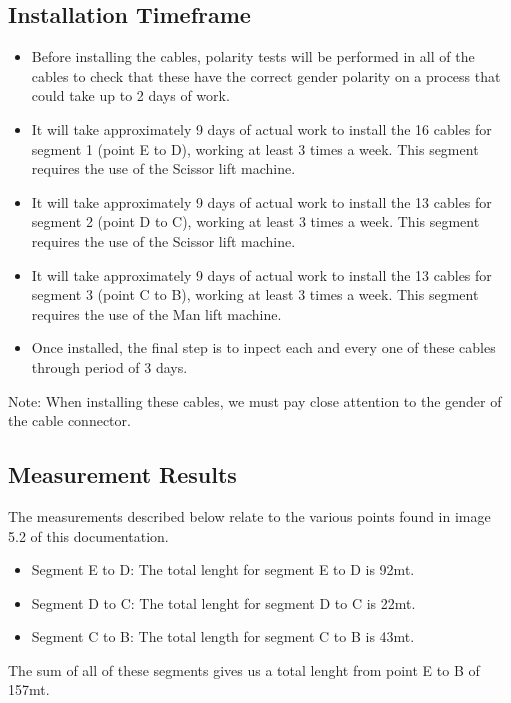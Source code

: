 \newpage

  \subsection{Installation Timeframe}
  \begin{itemize}
    \item Before installing the cables, polarity tests will be performed in all of the cables to check that these have the correct gender polarity on a process that could take up to 2 days of work.  
  
    \item It will take approximately 9 days of actual work to install the 16 cables for segment 1 (point E to D), working at least 3 times a week. This segment requires the use of the Scissor lift machine. 
  
    \item It will take approximately 9 days of actual work to install the 13 cables for segment 2 (point D to C), working at least 3 times a week. This segment requires the use of the Scissor lift machine.
  
    \item It will take approximately 9 days of actual work to install the 13 cables for segment 3 (point C to B), working at least 3 times a week. This segment requires the use of the Man lift machine.
  
    \item Once installed, the final step is to inpect each and every one of these cables through period of 3 days. 
  \end{itemize}
  Note: When installing these cables, we must pay close attention to the gender of the cable connector.

\newpage

  \subsection{Measurement Results}
  The measurements described below relate to the various points found in image 5.2 of this documentation.
  \begin{itemize}
    \item Segment E to D: The total lenght for segment E to D is 92mt.
    \item Segment D to C: The total lenght for segment D to C is 22mt.
    \item Segment C to B: The total length for segment C to B is 43mt.
  \end{itemize}
  The sum of all of these segments gives us a total lenght from point E to B of 157mt.
